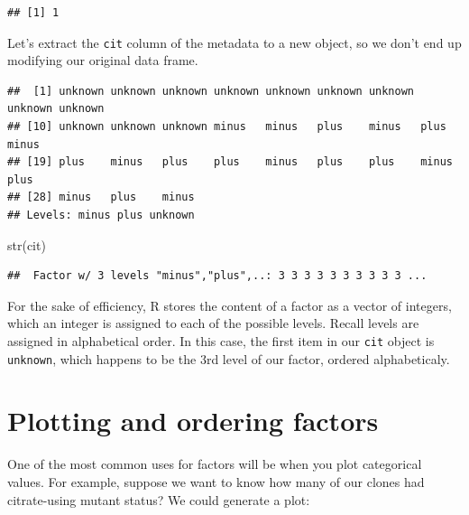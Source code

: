 \documentclass[
]{book}
\newenvironment{Shaded}{\begin{snugshade}}{\end{snugshade}}
\newcommand{\FunctionTok}[1]{\textcolor[rgb]{0.00,0.00,0.00}{#1}}
\newcommand{\NormalTok}[1]{#1}
\newcommand{\OtherTok}[1]{\textcolor[rgb]{0.56,0.35,0.01}{#1}}
\newcommand{\SpecialCharTok}[1]{\textcolor[rgb]{0.00,0.00,0.00}{#1}}
\begin{document}
\begin{verbatim}
## [1] 1
\end{verbatim}

Let's extract the \texttt{cit} column of the metadata to a new object, so we don't end up modifying our original data frame.

\begin{Shaded}
\end{Shaded}

\begin{verbatim}
##  [1] unknown unknown unknown unknown unknown unknown unknown unknown unknown
## [10] unknown unknown unknown minus   minus   plus    minus   plus    minus  
## [19] plus    minus   plus    plus    minus   plus    plus    minus   plus   
## [28] minus   plus    minus  
## Levels: minus plus unknown
\end{verbatim}

\begin{Shaded}
\begin{Highlighting}[]
\FunctionTok{str}\NormalTok{(cit)}
\end{Highlighting}
\end{Shaded}

\begin{verbatim}
##  Factor w/ 3 levels "minus","plus",..: 3 3 3 3 3 3 3 3 3 3 ...
\end{verbatim}

For the sake of efficiency, R stores the content of a factor as a vector of integers, which an integer is assigned to each of the possible levels. Recall levels are assigned in alphabetical order. In this case, the first item in our \texttt{cit} object is \texttt{unknown}, which happens to be the 3rd level of our factor, ordered alphabeticaly.

\hypertarget{plotting-and-ordering-factors}{%
\section{Plotting and ordering factors}\label{plotting-and-ordering-factors}}

One of the most common uses for factors will be when you plot categorical values. For example, suppose we want to know how many of our clones had citrate-using mutant status? We could generate a plot:
\end{document}
